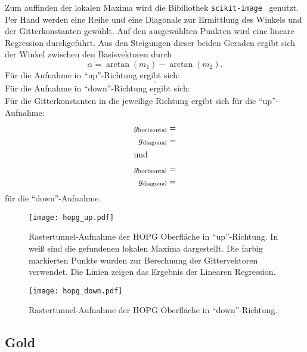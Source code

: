 Zum auffinden der lokalen Maxima wird die Bibiliothek \texttt{scikit-image}~\cite{skimage} genutzt.
Per Hand werden eine Reihe und eine Diagonale zur Ermittlung des Winkels und der Gitterkonstanten gewählt.
Auf den ausgewählten Punkten wird eine lineare Regression durchgeführt.
Aus den Steigungen dieser beiden Geraden ergibt sich der Winkel zwischen den Basisvektoren durch
\begin{equation}
  α = \arctan(m_1) -\arctan(m_2).
\end{equation}
Für die Aufnahme in \enquote{up}-Richtung ergibt sich:
\begin{equation}
  .
\end{equation}
Für die Aufnahme in \enquote{down}-Richtung ergibt sich:
\begin{equation}
  .
\end{equation}
Für die Gitterkonstanten in die jeweilige Richtung ergibt sich für die \enquote{up}-Aufnahme:
\begin{align}
  g_\text{horizontal} &=  \\
  g_\text{diagonal} &=  \\
\shortintertext{und}
  g_\text{horizontal} &=  \\
  g_\text{diagonal} &= 
\end{align}
für die \enquote{down}-Aufnahme.

\begin{figure}
  \centering
  \texttt{[image: hopg\_up.pdf]}
  \caption{%
    Rastertunnel-Aufnahme der HOPG Oberfläche in \enquote{up}-Richtung.
    In weiß sind die gefundenen lokalen Maxima dargestellt. Die farbig markierten Punkte wurden zur Berechnung der Gittervektoren verwendet.
    Die Linien zeigen das Ergebnis der Linearen Regression.
  }\label{fig:hopg_up}
\end{figure}

\begin{figure}
  \centering
  \texttt{[image: hopg\_down.pdf]}
  \caption{%
    Rastertunnel-Aufnahme der HOPG Oberfläche in \enquote{down}-Richtung.
  }\label{fig:hopg_down}
\end{figure}

\subsection{Gold}

